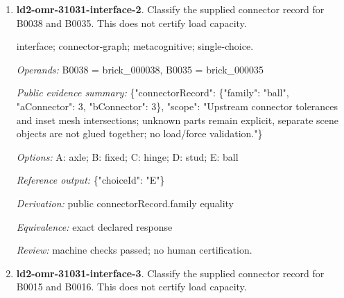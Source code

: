 \begin{enumerate}
\par{\small interface; connector-graph; metacognitive; single-choice.\par\textit{Operands:} B0049 = brick\_000049, B0110 = brick\_000110\par\textit{Public evidence summary:} \{"connectorRecord": \{"family": "axle", "aConnector": 1, "bConnector": 0\}, "scope": "Upstream connector tolerances and inset mesh intersections; unknown parts remain explicit, separate scene objects are not glued together; no load/force validation."\}\par\textit{Options:} A: hinge; B: fixed; C: axle; D: ball; E: stud\par\textit{Reference output:} \{"choiceId": "C"\}\par\textit{Derivation:} public connectorRecord.family equality\par\textit{Equivalence:} exact declared response\par\textit{Review:} machine checks passed; no human certification.}
\item \textbf{ld2-omr-31031-interface-2}. Classify the supplied connector record for B0038 and B0035. This does not certify load capacity.
\par{\small interface; connector-graph; metacognitive; single-choice.\par\textit{Operands:} B0038 = brick\_000038, B0035 = brick\_000035\par\textit{Public evidence summary:} \{"connectorRecord": \{"family": "ball", "aConnector": 3, "bConnector": 3\}, "scope": "Upstream connector tolerances and inset mesh intersections; unknown parts remain explicit, separate scene objects are not glued together; no load/force validation."\}\par\textit{Options:} A: axle; B: fixed; C: hinge; D: stud; E: ball\par\textit{Reference output:} \{"choiceId": "E"\}\par\textit{Derivation:} public connectorRecord.family equality\par\textit{Equivalence:} exact declared response\par\textit{Review:} machine checks passed; no human certification.}
\item \textbf{ld2-omr-31031-interface-3}. Classify the supplied connector record for B0015 and B0016. This does not certify load capacity.

\end{enumerate}

